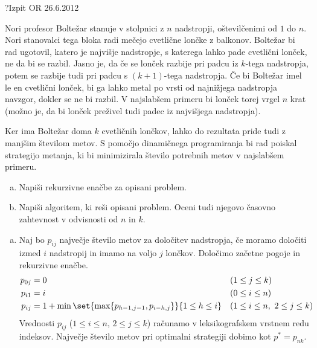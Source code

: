 \begin{naloga}{?}{Izpit OR 26.6.2012}
\begin{vprasanje}
Nori profesor Boltežar stanuje v stolpnici z $n$ nadstropji,
oštevilčenimi od $1$ do $n$.
Nori stanovalci tega bloka radi mečejo cvetlične lončke z balkonov.
Boltežar bi rad ugotovil, katero je najvišje nadstropje,
s katerega lahko pade cvetlični lonček, ne da bi se razbil.
Jasno je, da če se lonček razbije pri padcu iz $k$-tega nadstropja,
potem se razbije tudi pri padcu s $(k+1)$-tega nadstropja.
Če bi Boltežar imel le en cvetlični lonček,
bi ga lahko metal po vrsti od najnižjega nadstropja navzgor,
dokler se ne bi razbil.
V najslabšem primeru bi lonček torej vrgel $n$ krat
(možno je, da bi lonček preživel tudi padec iz najvišjega nadstropja).

Ker ima Boltežar doma $k$ cvetličnih lončkov,
lahko do rezultata pride tudi z manjšim številom metov.
S pomočjo dinamičnega programiranja bi rad po\-iskal strategijo metanja,
ki bi minimizirala število potrebnih metov v najslabšem primeru.
\begin{enumerate}[(a)]
\item Napiši rekurzivne enačbe za opisani problem.
\item Napiši algoritem, ki reši opisani problem.
Oceni tudi njegovo časovno zahtevnost v odvisnosti od $n$ in $k$.
\end{enumerate}
\end{vprasanje}

\begin{odgovor}
\begin{enumerate}[(a)]
\item Naj bo $p_{ij}$ največje število metov za določitev nadstropja,
če moramo določiti izmed $i$ nadstropij in imamo na voljo $j$ lončkov.
Določimo začetne pogoje in rekurzivne enačbe.
\begin{align*}
p_{0j} &= 0 && (1 \le j \le k) \\
p_{i1} &= i && (0 \le i \le n) \\
p_{ij} &= 1 + \min\set{\max\{p_{h-1,j-1}, p_{i-h,j}\}}{1 \le h \le i}
&& (1 \le i \le n, \ 2 \le j \le k)
\end{align*}
Vrednosti $p_{ij}$ ($1 \le i \le n$, $2 \le j \le k$)
računamo v leksikografskem vrstnem redu indeksov.
Največje število metov pri optimalni strategiji dobimo kot $p^* = p_{nk}$.


\end{enumerate}
\end{odgovor}
\end{naloga}
